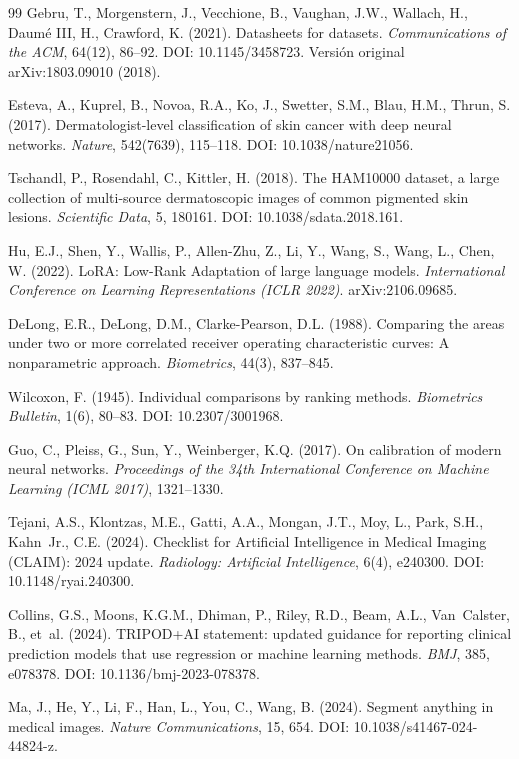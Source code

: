 \begin{thebibliography}{99}
Gebru, T., Morgenstern, J., Vecchione, B., Vaughan, J.W., Wallach, H., Daumé III, H., Crawford, K. (2021). Datasheets for datasets. \emph{Communications of the ACM}, 64(12), 86--92. DOI: 10.1145/3458723. Versión original arXiv:1803.09010 (2018).

Esteva, A., Kuprel, B., Novoa, R.A., Ko, J., Swetter, S.M., Blau, H.M., Thrun, S. (2017). Dermatologist-level classification of skin cancer with deep neural networks. \emph{Nature}, 542(7639), 115--118. DOI: 10.1038/nature21056.

Tschandl, P., Rosendahl, C., Kittler, H. (2018). The HAM10000 dataset, a large collection of multi-source dermatoscopic images of common pigmented skin lesions. \emph{Scientific Data}, 5, 180161. DOI: 10.1038/sdata.2018.161.

Hu, E.J., Shen, Y., Wallis, P., Allen-Zhu, Z., Li, Y., Wang, S., Wang, L., Chen, W. (2022). LoRA: Low-Rank Adaptation of large language models. \emph{International Conference on Learning Representations (ICLR 2022)}. arXiv:2106.09685.

DeLong, E.R., DeLong, D.M., Clarke-Pearson, D.L. (1988). Comparing the areas under two or more correlated receiver operating characteristic curves: A nonparametric approach. \emph{Biometrics}, 44(3), 837--845.

Wilcoxon, F. (1945). Individual comparisons by ranking methods. \emph{Biometrics Bulletin}, 1(6), 80--83. DOI: 10.2307/3001968.

Guo, C., Pleiss, G., Sun, Y., Weinberger, K.Q. (2017). On calibration of modern neural networks. \emph{Proceedings of the 34th International Conference on Machine Learning (ICML 2017)}, 1321--1330.

Tejani, A.S., Klontzas, M.E., Gatti, A.A., Mongan, J.T., Moy, L., Park, S.H., Kahn~Jr., C.E. (2024). Checklist for Artificial Intelligence in Medical Imaging (CLAIM): 2024 update. \emph{Radiology: Artificial Intelligence}, 6(4), e240300. DOI: 10.1148/ryai.240300.

Collins, G.S., Moons, K.G.M., Dhiman, P., Riley, R.D., Beam, A.L., Van~Calster, B., et~al. (2024). TRIPOD+AI statement: updated guidance for reporting clinical prediction models that use regression or machine learning methods. \emph{BMJ}, 385, e078378. DOI: 10.1136/bmj-2023-078378.

Ma, J., He, Y., Li, F., Han, L., You, C., Wang, B. (2024). Segment anything in medical images. \emph{Nature Communications}, 15, 654. DOI: 10.1038/s41467-024-44824-z.


\end{thebibliography}
